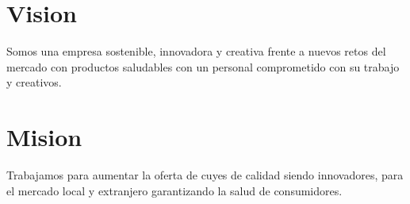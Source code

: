 \documentclass[11pt]{article}
\begin{document}
\section{Vision}
Somos una empresa sostenible, innovadora y creativa frente a nuevos retos del mercado con productos saludables con un personal comprometido con su trabajo y creativos.
\section{Mision}
Trabajamos para aumentar la oferta de cuyes de calidad siendo innovadores, para el mercado local y extranjero garantizando la salud de consumidores.
\end{document}
